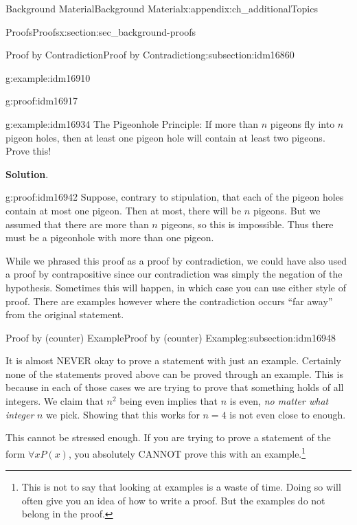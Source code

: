 \documentclass[oneside,10pt,]{book}
\numberwithin{equation}{chapter}
\begin{document}
\begin{appendixptx}{Background Material}{}{Background Material}{}{}{x:appendix:ch_additionalTopics}
\begin{sectionptx}{Proofs}{}{Proofs}{}{}{x:section:sec_background-proofs}
\begin{subsectionptx}{Proof by Contradiction}{}{Proof by Contradiction}{}{}{g:subsection:idm16860}
\begin{example}{}{g:example:idm16910}
\begin{proofptx}{}{g:proof:idm16917}
\end{proofptx}
\end{example}
\begin{example}{}{g:example:idm16934}%
The Pigeonhole Principle: If more than \(n\) pigeons fly into \(n\) pigeon holes, then at least one pigeon hole will contain at least two pigeons. Prove this!%
\par\smallskip%
\noindent\textbf{Solution}.\hypertarget{g:solution:idm16941}{}\quad{}\begin{proofptx}{}{g:proof:idm16942}
Suppose, contrary to stipulation, that each of the pigeon holes contain at most one pigeon. Then at most, there will be \(n\) pigeons. But we assumed that there are more than \(n\) pigeons, so this is impossible. Thus there must be a pigeonhole with more than one pigeon.%
\end{proofptx}
While we phrased this proof as a proof by contradiction, we could have also used a proof by contrapositive since our contradiction was simply the negation of the hypothesis. Sometimes this will happen, in which case you can use either style of proof. There are examples however where the contradiction occurs ``far away'' from the original statement.%
\end{example}
\end{subsectionptx}
%
%
\typeout{************************************************}
\typeout{************************************************}
%
\begin{subsectionptx}{Proof by (counter) Example}{}{Proof by (counter) Example}{}{}{g:subsection:idm16948}
%
\par
It is almost NEVER okay to prove a statement with just an example. Certainly none of the statements proved above can be proved through an example. This is because in each of those cases we are trying to prove that something holds of all integers. We claim that \(n^2\) being even implies that \(n\) is even, \emph{no matter what integer} \(n\) we pick. Showing that this works for \(n = 4\) is not even close to enough.%
\par
This cannot be stressed enough. If you are trying to prove a statement of the form \(\forall x P(x)\), you absolutely CANNOT prove this with an example.\footnote{This is not to say that looking at examples is a waste of time. Doing so will often give you an idea of how to write a proof. But the examples do not belong in the proof.\label{g:fn:idm16962}}%
\par

\end{subsectionptx}
\end{sectionptx}
\end{appendixptx}
\end{document}
